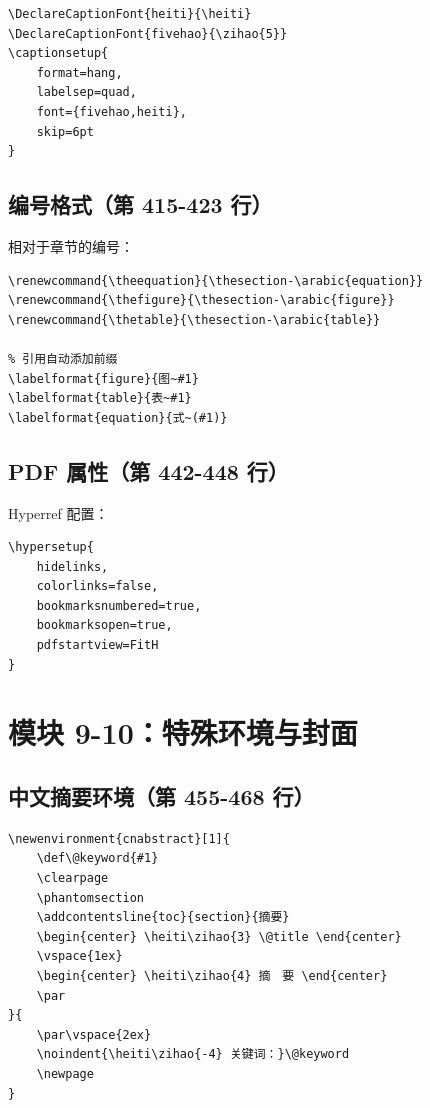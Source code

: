 \documentclass[linux]{hustreport}
\begin{document}
\begin{verbatim}
\DeclareCaptionFont{heiti}{\heiti}
\DeclareCaptionFont{fivehao}{\zihao{5}}
\captionsetup{
    format=hang,
    labelsep=quad,
    font={fivehao,heiti},
    skip=6pt
}
\end{verbatim}

\subsection{编号格式（第 415-423 行）}

相对于章节的编号：

\begin{verbatim}
\renewcommand{\theequation}{\thesection-\arabic{equation}}
\renewcommand{\thefigure}{\thesection-\arabic{figure}}
\renewcommand{\thetable}{\thesection-\arabic{table}}

% 引用自动添加前缀
\labelformat{figure}{图~#1}
\labelformat{table}{表~#1}
\labelformat{equation}{式~(#1)}
\end{verbatim}

\subsection{PDF 属性（第 442-448 行）}

Hyperref 配置：

\begin{verbatim}
\hypersetup{
    hidelinks,
    colorlinks=false,
    bookmarksnumbered=true,
    bookmarksopen=true,
    pdfstartview=FitH
}
\end{verbatim}

\newpage
\section{模块 9-10：特殊环境与封面}

\subsection{中文摘要环境（第 455-468 行）}

\begin{verbatim}
\newenvironment{cnabstract}[1]{
    \def\@keyword{#1}
    \clearpage
    \phantomsection
    \addcontentsline{toc}{section}{摘要}
    \begin{center} \heiti\zihao{3} \@title \end{center}
    \vspace{1ex}
    \begin{center} \heiti\zihao{4} 摘　要 \end{center}
    \par
}{
    \par\vspace{2ex}
    \noindent{\heiti\zihao{-4} 关键词：}\@keyword
    \newpage
}
\end{verbatim}
\end{document}
